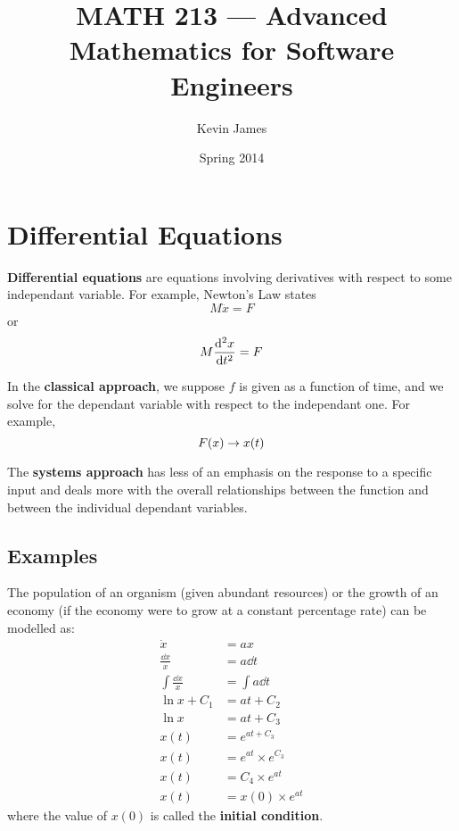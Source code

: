 \documentclass[12pt]{article}
\begin{document}
\title{MATH 213 --- Advanced Mathematics for Software Engineers}
\author{Kevin James}
\date{\vspace{-2ex}Spring 2014}
\maketitle\HRule

\section{Differential Equations}
{\bf Differential equations} are equations involving derivatives with respect to some independant variable. For example, Newton's Law states \[ M \ddot x = F \] or \[ M \frac{{\rm d}^2 x}{{\rm d} t^2} = F \]

In the {\bf classical approach}, we suppose $f$ is given as a function of time, and we solve for the dependant variable with respect to the independant one. For example, \[ F(x) \rightarrow x(t) \]

The {\bf systems approach} has less of an emphasis on the response to a specific input and deals more with the overall relationships between the function and between the individual dependant variables.

\subsection{Examples}
The population of an organism (given abundant resources) or the growth of an economy (if the economy were to grow at a constant percentage rate) can be modelled as:
\begin{align*}
\dot x &= ax\\
\frac{\dd x}{x} &= a \dd t\\
\int \frac{\dd x}{x} &= \int a \dd t\\
\ln x + C_1 &= at + C_2\\
\ln x &= at + C_3\\
x(t) &= e^{at + C_3}\\
x(t) &= e^{at} \times e^{C_3}\\
x(t) &= C_4 \times e^{at}\\
x(t) &= x(0) \times e^{at}
\end{align*}
where the value of $x(0)$ is called the {\bf initial condition}.
\end{document}
